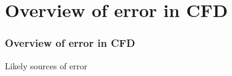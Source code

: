 \documentclass{beamer}
\begin{document}


\section[Error]{Overview of error in CFD}
\begin{frame}%
\frametitle{Overview of error in CFD}
\vspace{0pt}
\begin{minipage}[t][1.1\textheight]{1\textwidth}
\scriptsize
\vspace{-20pt}
\begin{exampleblock}{Likely sources of error}
\vspace{-20pt}
\begin{figure}[h!]
\end{figure}
\end{exampleblock}
\end{minipage}
\end{frame}
\end{document}
